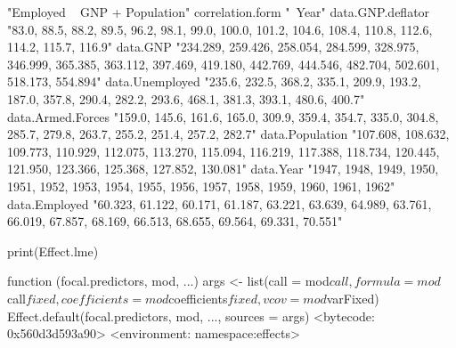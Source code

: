 \documentclass[
]{article}
\begin{document}
\begin{Schunk}
\begin{Soutput}
                                                                                                                   "Employed ~ GNP + Population" 
                                                                                                                                correlation.form 
                                                                                                                                         "~Year" 
                                                                                                                               data.GNP.deflator 
                                       "83.0, 88.5, 88.2, 89.5, 96.2, 98.1, 99.0, 100.0, 101.2, 104.6, 108.4, 110.8, 112.6, 114.2, 115.7, 116.9" 
                                                                                                                                        data.GNP 
"234.289, 259.426, 258.054, 284.599, 328.975, 346.999, 365.385, 363.112, 397.469, 419.180, 442.769, 444.546, 482.704, 502.601, 518.173, 554.894" 
                                                                                                                                 data.Unemployed 
                                "235.6, 232.5, 368.2, 335.1, 209.9, 193.2, 187.0, 357.8, 290.4, 282.2, 293.6, 468.1, 381.3, 393.1, 480.6, 400.7" 
                                                                                                                               data.Armed.Forces 
                                "159.0, 145.6, 161.6, 165.0, 309.9, 359.4, 354.7, 335.0, 304.8, 285.7, 279.8, 263.7, 255.2, 251.4, 257.2, 282.7" 
                                                                                                                                 data.Population 
"107.608, 108.632, 109.773, 110.929, 112.075, 113.270, 115.094, 116.219, 117.388, 118.734, 120.445, 121.950, 123.366, 125.368, 127.852, 130.081" 
                                                                                                                                       data.Year 
                                                "1947, 1948, 1949, 1950, 1951, 1952, 1953, 1954, 1955, 1956, 1957, 1958, 1959, 1960, 1961, 1962" 
                                                                                                                                   data.Employed 
                "60.323, 61.122, 60.171, 61.187, 63.221, 63.639, 64.989, 63.761, 66.019, 67.857, 68.169, 66.513, 68.655, 69.564, 69.331, 70.551" 
\end{Soutput}
\end{Schunk}
\begin{Schunk}
\begin{Sinput}
 print(Effect.lme)
\end{Sinput}
\begin{Soutput}
function (focal.predictors, mod, ...) 
{
    args <- list(call = mod$call, formula = mod$call$fixed, coefficients = mod$coefficients$fixed, 
        vcov = mod$varFixed)
    Effect.default(focal.predictors, mod, ..., sources = args)
}
<bytecode: 0x560d3d593a90>
<environment: namespace:effects>
\end{Soutput}
\end{Schunk}
\end{document}
